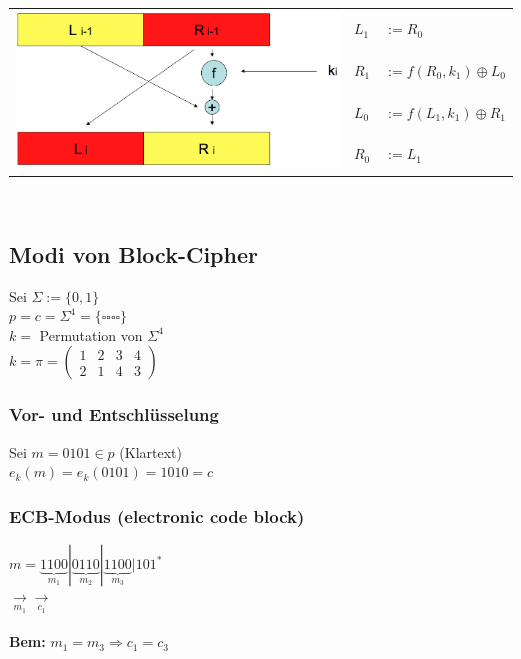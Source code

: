 \documentclass[10pt]{article}
\newcommand{\Bold}[1]{\textbf{#1}} %
\newcommand{\Ra}{\Rightarrow}
\newcommand{\Array}[2]{\left(\begin{array}{#1}#2\end{array}\right)} %
\newcommand{\Unten}[2]{\underset{#1}{#2}} %
\begin{document}
\begin{tabular}{l | l l}
	\multirow{4}{*}{\includegraphics[scale=0.12]{horst-feistel.png}} & $L_1$ & $:= R_0$ \\
	&$R_1$ & $:= f(R_0,k_1) \oplus L_0$ \\
	&$L_0$ & $:= f(L_1,k_1) \oplus R_1$ \\
	&$R_0$ & $:= L_1$ \\
\end{tabular} \\
\subsection{Modi von Block-Cipher}
Sei $\Sigma:=\{0,1\}$\\ 
$p=c=\Sigma^4=\{\square\square\square\square\}$\\
$k=$ Permutation von $\Sigma^4$\\
$k=\pi=\Array{cccc}{1&2&3&4\\2&1&4&3}$\\
\subsubsection*{Vor- und Entschlüsselung}
Sei $m=0101\in p$ (Klartext)\\ 
$e_k(m)=e_k(0101)=1010=c$
\subsubsection{ECB-Modus (electronic code block)}
 $m=\underbrace{1100}_{m_1}|\underbrace{0110}_{m_2}|\underbrace{1100}_{m_3}|101^*$\\
 $\Unten{m_1}{\longrightarrow}$$\Unten{c_1}{\longrightarrow}$\\
 \\
 \Bold{Bem:} $m_1=m_3\Ra c_1=c_3$
\end{document}
